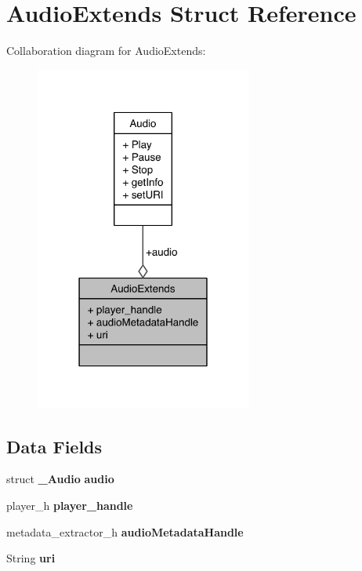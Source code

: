 \section{Audio\-Extends Struct Reference}
\label{structAudioExtends}


Collaboration diagram for Audio\-Extends\-:\nopagebreak
\begin{figure}[H]
\begin{center}
\leavevmode
\includegraphics[width=202pt]{structAudioExtends__coll__graph}
\end{center}
\end{figure}
\subsection*{Data Fields}
\begin{DoxyCompactItemize}
\item 
struct {\bf \-\_\-\-Audio} {\bfseries audio}\label{structAudioExtends_adc9639b5d2095eaa4448eabcf64a5e29}

\item 
player\-\_\-h {\bfseries player\-\_\-handle}\label{structAudioExtends_abbed38c2e4038c11cfcc5f67f1c07177}

\item 
metadata\-\_\-extractor\-\_\-h {\bfseries audio\-Metadata\-Handle}\label{structAudioExtends_a4fe2efe9d2248269495270bf363575c5}

\item 
String {\bfseries uri}\label{structAudioExtends_a0ed432fe28e9a4da0014815627c6103d}

\end{DoxyCompactItemize}


